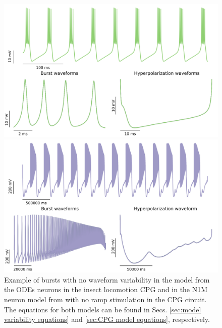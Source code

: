 \begin{figure}[hbt]
	\centering
	\begin{minipage}{0.48\textwidth}
		\includegraphics[width=\textwidth]{img/invariants/variability/GHmodel.png}
	\end{minipage}
	\begin{minipage}{0.48\textwidth}
		\includegraphics[width=\textwidth]{img/invariants/variability/N1Mnovar.png}
	\end{minipage}
	\caption{Example of bursts with no waveform variability in the \textcite{ghigliazza_minimal_2004b} model from the ODEs neurons in the insect locomotion CPG and in the N1M neuron model from \textcite{vavoulis_dynamic_2007} with no ramp stimulation in the CPG circuit. The equations for both models can be found in Secs. \ref{sec:model variability equations} and \ref{sec:CPG model equations}, respectively.}
	\label{fig:model burst no variability}
\end{figure}



